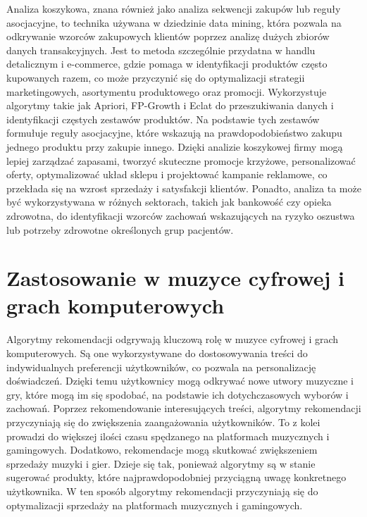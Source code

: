 \documentclass{article}
\begin{document}
Analiza koszykowa, znana również jako analiza sekwencji zakupów lub reguły asocjacyjne, to technika używana w dziedzinie data mining, która pozwala na odkrywanie wzorców zakupowych 
klientów poprzez analizę dużych zbiorów danych transakcyjnych. Jest to metoda szczególnie przydatna w handlu detalicznym i e-commerce, gdzie pomaga w identyfikacji produktów często 
kupowanych razem, co może przyczynić się do optymalizacji strategii marketingowych, asortymentu produktowego oraz promocji. Wykorzystuje algorytmy takie jak Apriori, FP-Growth 
i Eclat do przeszukiwania danych i identyfikacji częstych zestawów produktów. Na podstawie tych zestawów formułuje reguły asocjacyjne, które wskazują na prawdopodobieństwo zakupu 
jednego produktu przy zakupie innego. \newline
Dzięki analizie koszykowej firmy mogą lepiej zarządzać zapasami, tworzyć skuteczne promocje krzyżowe, personalizować oferty, optymalizować układ sklepu i projektować kampanie 
reklamowe, co przekłada się na wzrost sprzedaży i satysfakcji klientów. Ponadto, analiza ta może być wykorzystywana w różnych sektorach, takich jak bankowość czy opieka zdrowotna, 
do identyfikacji wzorców zachowań wskazujących na ryzyko oszustwa lub potrzeby zdrowotne określonych grup pacjentów.

\section{Zastosowanie w muzyce cyfrowej i grach komputerowych}

Algorytmy rekomendacji odgrywają kluczową rolę w muzyce cyfrowej i grach komputerowych. Są one wykorzystywane do dostosowywania treści do indywidualnych preferencji użytkowników, 
co pozwala na personalizację doświadczeń. Dzięki temu użytkownicy mogą odkrywać nowe utwory muzyczne i gry, które mogą im się spodobać, na podstawie ich dotychczasowych wyborów 
i zachowań.\newline
Poprzez rekomendowanie interesujących treści, algorytmy rekomendacji przyczyniają się do zwiększenia zaangażowania użytkowników. To z kolei prowadzi do większej ilości czasu 
spędzanego na platformach muzycznych i gamingowych.
Dodatkowo, rekomendacje mogą skutkować zwiększeniem sprzedaży muzyki i gier. Dzieje się tak, ponieważ algorytmy są w stanie sugerować produkty, które najprawdopodobniej przyciągną 
uwagę konkretnego użytkownika. W ten sposób algorytmy rekomendacji przyczyniają się do optymalizacji sprzedaży na platformach muzycznych i gamingowych.
\end{document}
